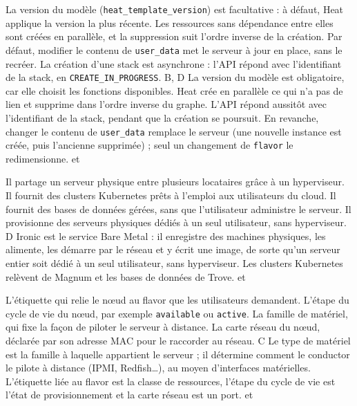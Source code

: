   {La version du modèle (\texttt{heat\_template\_version}) est facultative : à défaut, Heat applique la version la plus récente.}
  {Les ressources sans dépendance entre elles sont créées en parallèle, et la suppression suit l'ordre inverse de la création.}
  {Par défaut, modifier le contenu de \texttt{user\_data} met le serveur à jour en place, sans le recréer.}
  {La création d'une stack est asynchrone : l'API répond avec l'identifiant de la stack, en \texttt{CREATE\_IN\_PROGRESS}.}
  {B, D}
  {La version du modèle est obligatoire, car elle choisit les fonctions disponibles. Heat crée en parallèle ce qui n'a pas de lien et supprime dans l'ordre inverse du graphe. L'API répond aussitôt avec l'identifiant de la stack, pendant que la création se poursuit. En revanche, changer le contenu de \texttt{user\_data} remplace le serveur (une nouvelle instance est créée, puis l'ancienne supprimée) ; seul un changement de \texttt{flavor} le redimensionne.}
  { et }


  {Il partage un serveur physique entre plusieurs locataires grâce à un hyperviseur.}
  {Il fournit des clusters Kubernetes prêts à l'emploi aux utilisateurs du cloud.}
  {Il fournit des bases de données gérées, sans que l'utilisateur administre le serveur.}
  {Il provisionne des serveurs physiques dédiés à un seul utilisateur, sans hyperviseur.}
  {D}
  {Ironic est le service Bare Metal : il enregistre des machines physiques, les alimente, les démarre par le réseau et y écrit une image, de sorte qu'un serveur entier soit dédié à un seul utilisateur, sans hyperviseur. Les clusters Kubernetes relèvent de Magnum et les bases de données de Trove.}
  { et }

  {L'étiquette qui relie le nœud au flavor que les utilisateurs demandent.}
  {L'étape du cycle de vie du nœud, par exemple \texttt{available} ou \texttt{active}.}
  {La famille de matériel, qui fixe la façon de piloter le serveur à distance.}
  {La carte réseau du nœud, déclarée par son adresse MAC pour le raccorder au réseau.}
  {C}
  {Le type de matériel est la famille à laquelle appartient le serveur ; il détermine comment le conductor le pilote à distance (IPMI, Redfish\dots), au moyen d'interfaces matérielles. L'étiquette liée au flavor est la classe de ressources, l'étape du cycle de vie est l'état de provisionnement et la carte réseau est un port.}
  { et }

